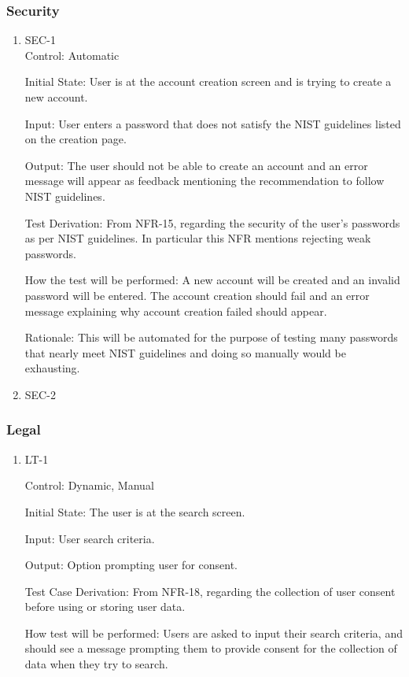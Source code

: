 \documentclass[12pt, titlepage]{article}
\begin{document}
\subsubsection {Security}
\begin{enumerate}
  \item{SEC-1\\}
  Control: Automatic

  Initial State: User is at the account creation screen and is trying to create a new account.

  Input: User enters a password that does not satisfy the NIST guidelines listed on the creation page.
  
  Output: The user should not be able to create an account and an 
  error message will appear as feedback mentioning the recommendation to follow NIST guidelines.

  Test Derivation: From NFR-15, regarding the security of the user's passwords as per NIST guidelines.
  In particular this NFR mentions rejecting weak passwords.

  How the test will be performed: A new account will be created and an invalid password will be entered. 
  The account creation should fail and an error message explaining why account creation failed
  should appear. 
  
  Rationale: This will be automated for the purpose of testing many passwords 
  that nearly meet NIST guidelines and doing so manually would be exhausting.
  
  \item {SEC-2\\}







\end{enumerate}
\subsubsection{Legal}

\begin{enumerate}
\item{LT-1}

Control: Dynamic, Manual
					
Initial State: The user is at the search screen.

Input: User search criteria.

Output: Option prompting user for consent.

Test Case Derivation: From NFR-18, regarding the collection of user consent before using or storing user data.

How test will be performed: Users are asked to input their search criteria, and should see a message prompting them to provide consent for the collection of data when they try to search.

\end{enumerate}
\end{document}
